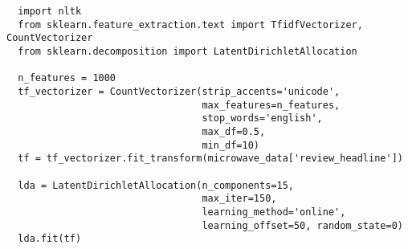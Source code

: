 \documentclass[12pt]{article}
\begin{document}
\begin{appendices}
\begin{verbatim}
  import nltk
  from sklearn.feature_extraction.text import TfidfVectorizer, CountVectorizer
  from sklearn.decomposition import LatentDirichletAllocation

  n_features = 1000
  tf_vectorizer = CountVectorizer(strip_accents='unicode',
                                  max_features=n_features,
                                  stop_words='english',
                                  max_df=0.5,
                                  min_df=10)
  tf = tf_vectorizer.fit_transform(microwave_data['review_headline'])

  lda = LatentDirichletAllocation(n_components=15,
                                  max_iter=150,
                                  learning_method='online',
                                  learning_offset=50, random_state=0)
  lda.fit(tf)
  \end{verbatim}
	\end{appendices}
	
	
	
	
\end{document}
